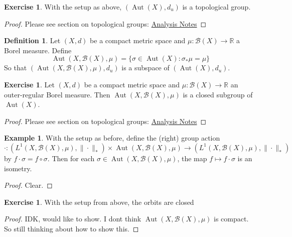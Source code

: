 \documentclass[12pt]{amsart}
\theoremstyle{definition}
\newtheorem{defn}[definition]{Definition}
\newtheorem{ex}[definition]{Exercise}
\newtheorem{exm}[definition]{Example}
\newcommand{\sig}{\sigma}
\newcommand{\R}{\mathbb{R}}
\newcommand{\MB}{\mathcal{B}}
\DeclareMathOperator{\Aut}{Aut}
\begin{document}
	\begin{ex}
	With the setup as above, $(\Aut(X), d_{u} )$ is a topological group.
	\end{ex}
	
	\begin{proof}
	Please see section on topological groups: \href{https://github.com/carsonaj/Mathematics/blob/master/Introduction\%20to\%20Analysis/Introduction\%20to\%20Analysis.pdf}{Analysis Notes}
	\end{proof}
	
	\begin{defn}
	Let $(X,d)$ be a compact metric space and $\mu: \MB(X) \rightarrow \R$ a Borel measure. Define $$\Aut(X, \MB(X), \mu) = \{\sig \in \Aut(X): \sig_* \mu = \mu\}$$ 
	So that $(\Aut(X, \MB(X), \mu), d_{u} )$ is a subspace of $(\Aut(X), d_{u})$.
	\end{defn}
	
	\begin{ex}
	Let $(X,d)$ be a compact metric space and $\mu: \MB(X) \rightarrow \R$ an outer-regular Borel measure. Then $\Aut(X, \MB(X), \mu)$ is a closed subgroup of $\Aut(X)$.
	\end{ex}
	
	\begin{proof}
	Please see section on topological groups: \href{https://github.com/carsonaj/Mathematics/blob/master/Introduction\%20to\%20Analysis/Introduction\%20to\%20Analysis.pdf}{Analysis Notes}
	\end{proof}
	
	\begin{exm}
	With the setup as before, define the (right) group action \\ $\cdot: (L^1(X, \MB(X), \mu), \|\cdot\|_*) \times \Aut(X, \MB(X), \mu) \rightarrow (L^1(X, \MB(X), \mu), \|\cdot\|_*) $ by $f \cdot \sig = f \circ \sig$. Then for each $\sig \in \Aut(X, \MB(X), \mu)$, the map $f \mapsto f \cdot \sig$ is an isometry. 
	\end{exm}
	
	\begin{proof}
	Clear.
	\end{proof}
	
	\begin{ex}
	With the setup from above, the orbits are closed
	\end{ex}
	
	\begin{proof}
	IDK, would like to show. I dont think $\Aut(X, \MB(X), \mu)$ is compact. So still thinking about how to show this.
	\end{proof}
	
	
\end{document}
